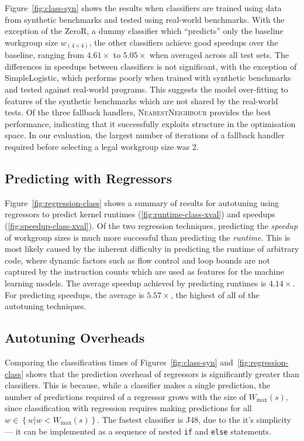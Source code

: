 \documentclass[preprint,nonatbib,10pt]{sigplanconf}
\begin{document}
Figure~\ref{fig:class-syn} shows the results when classifiers are
trained using data from synthetic benchmarks and tested using
real-world benchmarks. With the exception of the ZeroR, a dummy
classifier which ``predicts'' only the baseline workgroup size
$w_{\left( 4 \times 4 \right)}$, the other classifiers achieve good
speedups over the baseline, ranging from $4.61\times$ to $5.05\times$
when averaged across all test sets. The differences in speedups
between classifiers is not significant, with the exception of
SimpleLogistic, which performs poorly when trained with synthetic
benchmarks and tested against real-world programs. This suggests the
model over-fitting to features of the synthetic benchmarks which are
not shared by the real-world tests. Of the three fallback handlers,
\textsc{NearestNeighbour} provides the best performance, indicating
that it successfully exploits structure in the optimisation space. In
our evaluation, the largest number of iterations of a fallback handler
required before selecting a legal workgroup size was 2.


\subsection{Predicting with Regressors}

Figure~\ref{fig:regression-class} shows a summary of results for
autotuning using regressors to predict kernel runtimes
(\ref{fig:runtime-class-xval}) and speedups
(\ref{fig:speedup-class-xval}). Of the two regression techniques,
predicting the \emph{speedup} of workgroup sizes is much more
successful than predicting the \emph{runtime}. This is most likely
caused by the inherent difficulty in predicting the runtime of
arbitrary code, where dynamic factors such as flow control and loop
bounds are not captured by the instruction counts which are used as
features for the machine learning models. The average speedup achieved
by predicting runtimes is $4.14\times$. For predicting speedups, the
average is $5.57\times$, the highest of all of the autotuning
techniques.

\subsection{Autotuning Overheads}

Comparing the classification times of Figures~\ref{fig:class-syn}
and~\ref{fig:regression-class} shows that the prediction overhead of
regressors is significantly greater than classifiers. This is because,
while a classifier makes a single prediction, the number of
predictions required of a regressor grows with the size of
$W_{\max}(s)$, since classification with regression requires making
predictions for all $w \in \left\{ w | w < W_{\max}(s) \right\}$. The
fastest classifier is J48, due to the it's simplicity --- it can be
implemented as a sequence of nested \texttt{if} and \texttt{else}
statements.
\end{document}
